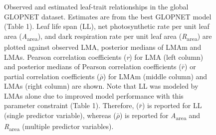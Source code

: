 \documentclass[
  12pt,
  letterpaper,
  DIV=11,
  numbers=noendperiod]{scrartcl}
\begin{document}
\begin{figure}


\caption{\label{fig-gl_point}Observed and estimated leaf-trait
relationships in the global GLOPNET dataset. Estimates are from the best
GLOPNET model (Table 1). Leaf life span (LL), net photosynthetic rate
per unit leaf area (\emph{A}\textsubscript{area}), and dark respiration
rate per unit leaf area (\emph{R}\textsubscript{area}) are plotted
against observed LMA, posterior medians of LMAm and LMAs. Pearson
correlation coefficients (\emph{r}) for LMA (left column) and posterior
medians of Pearson correlation coefficients (\(\bar{r}\)) or partial
correlation coefficients (\(\bar{\rho}\)) for LMAm (middle column) and
LMAs (right column) are shown. Note that LL was modeled by LMAs alone
due to improved model performance with this parameter constraint (Table
1). Therefore, (\(\bar{r}\)) is reported for LL (single predictor
variable), whereas (\(\bar{\rho}\)) is reported for
\emph{A}\textsubscript{area} and \emph{R}\textsubscript{area} (multiple
predictor variables).}

\end{figure}%
\end{document}
